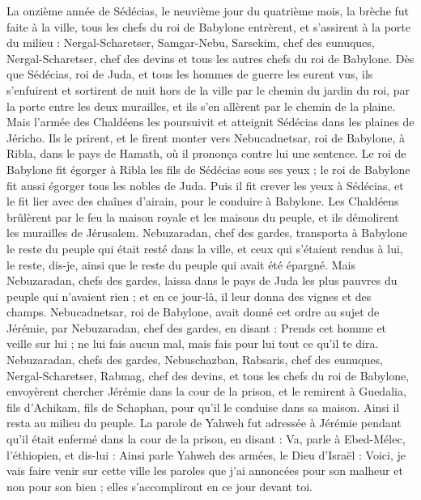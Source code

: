 \begin{multicols}{2}
La onzième année de Sédécias, le neuvième jour du quatrième mois, la brèche fut faite à la ville,
tous les chefs du roi de Babylone entrèrent, et s'assirent à la porte du milieu : Nergal-Scharetser, Samgar-Nebu, Sarsekim, chef des eunuques, Nergal-Scharetser, chef des devins et tous les autres chefs du roi de Babylone.
Dès que Sédécias, roi de Juda, et tous les hommes de guerre les eurent vus, ils s'enfuirent et sortirent de nuit hors de la ville par le chemin du jardin du roi, par la porte entre les deux murailles, et ils s'en allèrent par le chemin de la plaine.
Mais l'armée des Chaldéens les poursuivit et atteignit Sédécias dans les plaines de Jéricho. Ils le prirent, et le firent monter vers Nebucadnetsar, roi de Babylone, à Ribla, dans le pays de Hamath, où il prononça contre lui une sentence.
Le roi de Babylone fit égorger à Ribla les fils de Sédécias sous ses yeux ; le roi de Babylone fit aussi égorger tous les nobles de Juda.
Puis il fit crever les yeux à Sédécias, et le fit lier avec des chaînes d'airain, pour le conduire à Babylone.
Les Chaldéens brûlèrent par le feu la maison royale et les maisons du peuple, et ils démolirent les murailles de Jérusalem.
Nebuzaradan, chef des gardes, transporta à Babylone le reste du peuple qui était resté dans la ville, et ceux qui s'étaient rendus à lui, le reste, dis-je, ainsi que le reste du peuple qui avait été épargné.
Mais Nebuzaradan, chefs des gardes, laissa dans le pays de Juda les plus pauvres du peuple qui n'avaient rien ; et en ce jour-là, il leur donna des vignes et des champs.
Nebucadnetsar, roi de Babylone, avait donné cet ordre au sujet de Jérémie, par Nebuzaradan, chef des gardes, en disant :
Prends cet homme et veille sur lui ; ne lui fais aucun mal, mais fais pour lui tout ce qu'il te dira.
Nebuzaradan, chefs des gardes, Nebuschazban, Rabsaris, chef des eunuques, Nergal-Scharetser, Rabmag, chef des devins, et tous les chefs du roi de Babylone,
envoyèrent chercher Jérémie dans la cour de la prison, et le remirent à Guedalia, fils d'Achikam, fils de Schaphan, pour qu'il le conduise dans sa maison. Ainsi il resta au milieu du peuple.
La parole de Yahweh fut adressée à Jérémie pendant qu'il était enfermé dans la cour de la prison, en disant :
Va, parle à Ebed-Mélec, l'éthiopien, et dis-lui : Ainsi parle Yahweh des armées, le Dieu d'Israël : Voici, je vais faire venir sur cette ville les paroles que j'ai annoncées pour son malheur et non pour son bien ; elles s'accompliront en ce jour devant toi.

\end{multicols}
